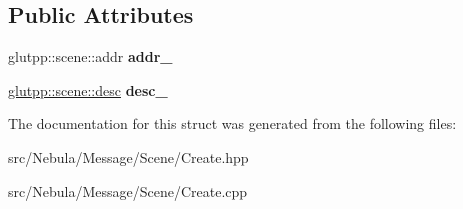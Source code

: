 \subsection*{\-Public \-Attributes}
\begin{DoxyCompactItemize}
\item 
\hypertarget{structglutpp_1_1network_1_1scene_1_1create_a56b5904bc6785c68e7e85ef5ddf27bee}{glutpp\-::scene\-::addr {\bfseries addr\-\_\-}}\label{structglutpp_1_1network_1_1scene_1_1create_a56b5904bc6785c68e7e85ef5ddf27bee}

\item 
\hypertarget{structglutpp_1_1network_1_1scene_1_1create_a43f9f4c58b0310c0eeb41cb057f74958}{\hyperlink{classglutpp_1_1scene_1_1desc}{glutpp\-::scene\-::desc} {\bfseries desc\-\_\-}}\label{structglutpp_1_1network_1_1scene_1_1create_a43f9f4c58b0310c0eeb41cb057f74958}

\end{DoxyCompactItemize}


\-The documentation for this struct was generated from the following files\-:\begin{DoxyCompactItemize}
\item 
src/\-Nebula/\-Message/\-Scene/\-Create.\-hpp\item 
src/\-Nebula/\-Message/\-Scene/\-Create.\-cpp\end{DoxyCompactItemize}
